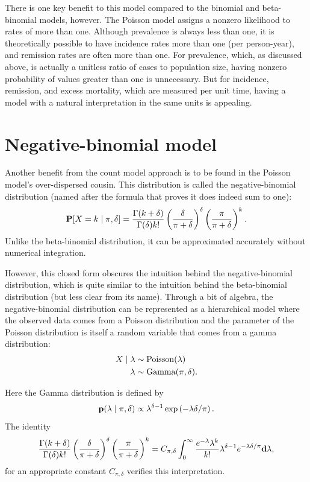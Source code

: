 There is one key benefit to this model compared to the binomial and
beta-binomial models, however.  The Poisson model assigns a nonzero
likelihood to rates of more than one.  Although prevalence is always
less than one, it is theoretically possible to have incidence rates
more than one (per person-year), and remission rates are often more
than one.  For prevalence, which, as discussed above, is actually a
unitless ratio of cases to population size, having nonzero probability
of values greater than one is unnecessary.  But for incidence,
remission, and excess mortality, which are measured per unit time,
having a model with a natural interpretation in the same units is
appealing.


\section{Negative-binomial model}
Another benefit from the count model approach is to be found in the
Poisson model's over-dispersed cousin.  This distribution is called
the negative-binomial distribution (named after the formula that
proves it does indeed sum to one):
\[
\mathbf{P}[X = k\;|\; \pi, \delta] =
 \frac{\Gamma(k+\delta)}{\Gamma(\delta)k!} \left(\frac{\delta}{\pi+\delta}\right)^\delta \left(\frac{\pi}{\pi+\delta}\right)^k.
\]
Unlike the beta-binomial distribution, it can be approximated
accurately without numerical integration.

However, this closed form obscures the intuition behind the
negative-binomial distribution, which is quite similar to the
intuition behind the beta-binomial distribution (but less clear from
its name). Through a bit of algebra, the negative-binomial
distribution can be represented as a hierarchical model where the
observed data comes from a Poisson distribution and the parameter of
the Poisson distribution is itself a random variable that comes from a
gamma distribution:
\begin{align*}
X\;|\; \lambda &\sim \operatorname{Poisson}(\lambda)\\
\lambda &\sim \operatorname{Gamma}(\pi, \delta).
\end{align*}

Here the Gamma distribution is defined by
\[
\mathbf{p}(\lambda \;|\; \pi, \delta) \propto \lambda^{\delta-1} \exp\left(-\lambda \delta/\pi \right).
\]
The identity
\[
\frac{\Gamma(k+\delta)}{\Gamma(\delta)k!} \left(\frac{\delta}{\pi+\delta}\right)^\delta \left(\frac{\pi}{\pi+\delta}\right)^k
=
 C_{\pi, \delta} \int_0^\infty \frac{e^{-\lambda}\lambda^k}{k!} \lambda^{\delta-1} e^{-\lambda \delta/\pi} \mathbf{d} \lambda,
\]
for an appropriate constant $C_{\pi,\delta}$ verifies this interpretation.

